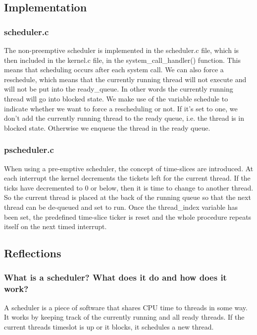 \subsection{Implementation}
\subsubsection*{scheduler.c}
The non-preemptive scheduler is implemented in the scheduler.c file, which is then included in the kernel.c file, in the system\_{}call\_{}handler() function. This means that scheduling occurs after each system call. We can also force a reschedule, which means that the currently running thread will not execute and will not be put into the ready\_{}queue. In other words the currently running thread will go into blocked state.
We make use of the variable schedule to indicate whether we want to force a rescheduling or not. If it's set to one, we don't add the currently running thread to the ready queue, i.e. the thread is in blocked state. Otherwise we enqueue the thread in the ready queue.

\subsubsection*{pscheduler.c}
When using a pre-emptive scheduler, the concept of time-slices are introduced.
At each interrupt the kernel decrements the tickets left for the current thread. If the ticks have decremented to 0 or below, then it is time to change to another thread. So the current thread is placed at the back of the running queue so that the next thread can be de-queued and set to run. Once the thread\_index variable has been set, the predefined time-slice ticker is reset and the whole procedure repeats itself on the next timed interrupt.

\subsection{Reflections}

\subsubsection*{What is a scheduler? What does it do and how does it work?}
A scheduler is a piece of software that shares CPU time to threads in some way. It works by keeping track of the currently running and all ready threads. If the current threads timeslot is up or it blocks, it schedules a new thread.
